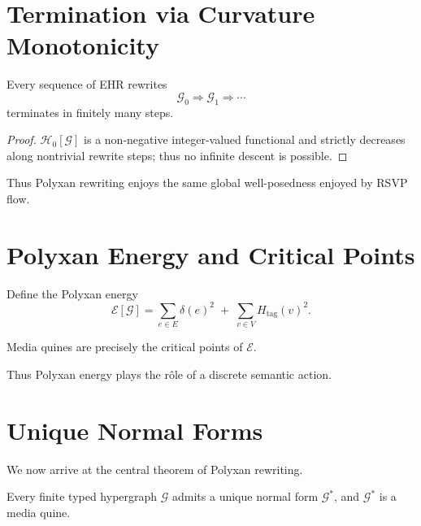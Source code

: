 \section{Termination via Curvature Monotonicity}

\begin{theorem}[Termination]
Every sequence of EHR rewrites
\[
\mathcal{G}_0 \Rightarrow \mathcal{G}_1 \Rightarrow \cdots
\]
terminates in finitely many steps.
\]
\end{theorem}

\begin{proof}
$\mathcal{H}_0[\mathcal{G}]$ is a non-negative integer-valued functional and
strictly decreases along nontrivial rewrite steps; thus no infinite descent is
possible.
\end{proof}

Thus Polyxan rewriting enjoys the same global well-posedness enjoyed by RSVP flow.

\section{Polyxan Energy and Critical Points}

Define the Polyxan energy
\[
\mathcal{E}[\mathcal{G}]
=
\sum_{e\in E} \delta(e)^2
\;+\;
\sum_{v\in V} H_{\mathrm{tag}}(v)^2.
\]

\begin{proposition}
Media quines are precisely the critical points of $\mathcal{E}$.
\end{proposition}

Thus Polyxan energy plays the rôle of a discrete semantic action.

\section{Unique Normal Forms}

We now arrive at the central theorem of Polyxan rewriting.

\begin{theorem}
Every finite typed hypergraph $\mathcal{G}$ admits a unique normal form
$\mathcal{G}^\ast$, and $\mathcal{G}^\ast$ is a media quine.
\end{theorem}

